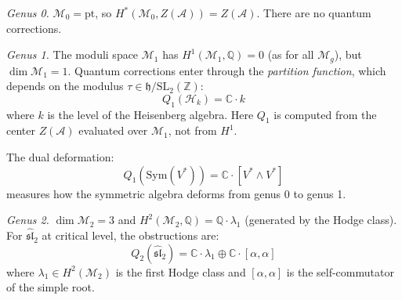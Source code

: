 \begin{remark}\label{rem:explicit-low-genus-curved}

\emph{Genus 0.} $\mathcal{M}_0 = \text{pt}$, so $H^*(\mathcal{M}_0, Z(\mathcal{A})) 
= Z(\mathcal{A})$. There are no quantum corrections.

\emph{Genus 1.} The moduli space $\mathcal{M}_1$ has $H^1(\mathcal{M}_1, \mathbb{Q}) = 0$ (as for all $\mathcal{M}_g$), but $\dim \mathcal{M}_1 = 1$.  Quantum corrections enter through the \emph{partition function}, which depends on the modulus $\tau \in \mathfrak{h}/\mathrm{SL}_2(\mathbb{Z})$:
\[Q_1(\mathcal{H}_k) = \mathbb{C} \cdot k\]
where $k$ is the level of the Heisenberg algebra.  Here $Q_1$ is computed from the center $Z(\mathcal{A})$ evaluated over $\mathcal{M}_1$, not from $H^1$.

The dual deformation:
\[Q_1(\text{Sym}(V^*)) = \mathbb{C} \cdot [V^* \wedge V^*]\]
measures how the symmetric algebra deforms from genus 0 to genus 1.

\emph{Genus 2.} $\dim \mathcal{M}_2 = 3$ and $H^2(\mathcal{M}_2, \mathbb{Q}) = \mathbb{Q} \cdot \lambda_1$ (generated by the Hodge class). For $\widehat{\mathfrak{sl}}_2$ at
critical level, the obstructions are:
\[Q_2(\widehat{\mathfrak{sl}}_2) = \mathbb{C} \cdot \lambda_1 \oplus \mathbb{C} \cdot
[\alpha, \alpha]\]
where $\lambda_1 \in H^2(\mathcal{M}_2)$ is the first Hodge class and $[\alpha, \alpha]$
is the self-commutator of the simple root.
\end{remark}

